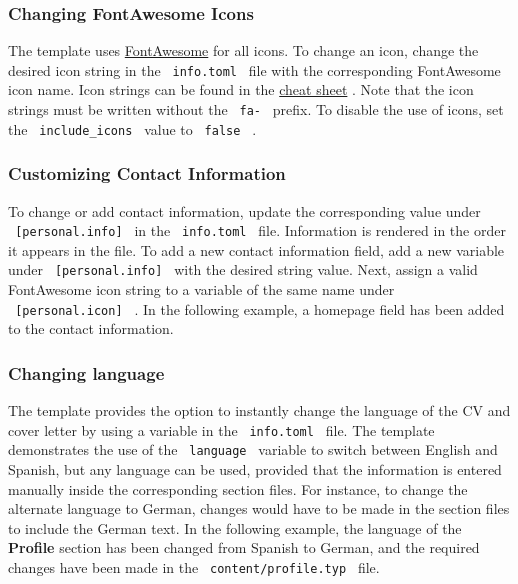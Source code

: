 \subsubsection{Changing FontAwesome
Icons}\label{changing-fontawesome-icons}

The template uses \href{https://fontawesome.com/}{FontAwesome} for all
icons. To change an icon, change the desired icon string in the
\texttt{\ info.toml\ } file with the corresponding FontAwesome icon
name. Icon strings can be found in the
\href{https://fontawesome.com/v4/cheatsheet/}{cheat sheet} . Note that
the icon strings must be written without the \texttt{\ fa-\ } prefix. To
disable the use of icons, set the \texttt{\ include\_icons\ } value to
\texttt{\ false\ } .

\subsubsection{Customizing Contact
Information}\label{customizing-contact-information}

To change or add contact information, update the corresponding value
under \texttt{\ {[}personal.info{]}\ } in the \texttt{\ info.toml\ }
file. Information is rendered in the order it appears in the file. To
add a new contact information field, add a new variable under
\texttt{\ {[}personal.info{]}\ } with the desired string value. Next,
assign a valid FontAwesome icon string to a variable of the same name
under \texttt{\ {[}personal.icon{]}\ } . In the following example, a
homepage field has been added to the contact information.

\begin{Shaded}
\begin{Highlighting}[]
 \OperatorTok{=} 

 \OperatorTok{=} 
\end{Highlighting}
\end{Shaded}

\subsubsection{Changing language}\label{changing-language}

The template provides the option to instantly change the language of the
CV and cover letter by using a variable in the \texttt{\ info.toml\ }
file. The template demonstrates the use of the \texttt{\ language\ }
variable to switch between English and Spanish, but any language can be
used, provided that the information is entered manually inside the
corresponding section files. For instance, to change the alternate
language to German, changes would have to be made in the section files
to include the German text. In the following example, the language of
the \textbf{Profile} section has been changed from Spanish to German,
and the required changes have been made in the
\texttt{\ content/profile.typ\ } file.

